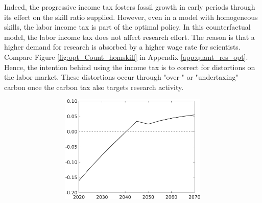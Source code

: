 Indeed, the progressive income tax fosters fossil growth in early periods through its effect on the skill ratio supplied. However, even in a model with homogeneous skills, the labor income tax is part of the optimal policy. In this counterfactual model, the labor income tax does not affect research effort. The reason is that a higher demand for research is absorbed by a higher wage rate for scientists. Compare Figure \ref{fig:opt_Count_homskill} in Appendix \ref{app:quant_res_opt}.  Hence, the intention behind using the income tax is to correct for distortions on the labor market. These distortions occur through "over-" or "undertaxing" carbon once the carbon tax also targets research activity. 


\begin{figure}[h!!!]
	\centering
	\caption{Decomposition effect of combined policy}\label{fig:efftaul}
	\begin{subfigure}{1\textwidth}
		\caption{\textbf{Deviation of combined policy from carbon-tax-only policy in percent}}
		\vspace{3mm}
	\begin{subfigure}{0.4\textwidth}
		\includegraphics[width=1\textwidth]{../../codding_model/own_basedOnFried/optimalPol_010922_revision/figures/all_13Sept22_Tplus30/Tauf_OPT_T_NoTaus_COMPtaulPer_regime4_spillover0_knspil0_noskill0_sep0_xgrowth0_PV1_etaa0.79.png}
	\end{subfigure}
\begin{minipage}[]{0.1\textwidth}
\
\end{minipage}
\begin{subfigure}{0.4\textwidth}

\end{subfigure}
\end{subfigure}
\end{figure}
